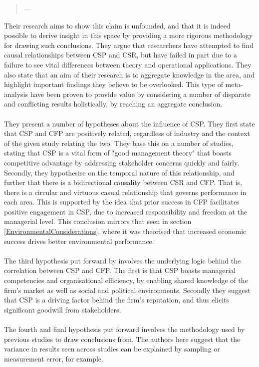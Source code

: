 {\begin{quote}
\hspace{2cm}--- \cite{orlitzky2003corporate}
\end{quote}
Their research aims to show this claim is unfounded, and that it is indeed possible to derive insight in this space by providing a more rigorous methodology for drawing such conclusions. They argue that researchers have attempted to find causal relationships between CSP and CSR, but have failed in part due to a failure to see vital differences between theory and operational applications. They also state that an aim of their research is to aggregate knowledge in the area, and highlight important findings they believe to be overlooked. This type of meta-analysis have been proven to provide value by considering a number of disparate and conflicting results holistically, by reaching an aggregate conclusion.\\\\
They present a number of hypotheses about the influence of CSP. They first state that CSP and CFP are positively related, regardless of industry and the context of the given study relating the two. They base this on a number of studies, stating that CSP is a vital form of "good management theory" that boasts competitive advantage by addressing stakeholder concerns quickly and fairly.  Secondly, they hypothesise on the temporal nature of this relationship, and further that there is a bidirectional causality between CSR and CFP. That is, there is a circular and virtuous casual relationship that governs performance in each area. This is supported by the idea that prior success in CFP facilitates positive engagement in CSP, due to increased responsibility and freedom at the managerial level. This conclusion mirrors that seen in section \ref{EnvironmentalConsiderations}, where it was theorised that increased economic success drives better environmental performance.\\\\
The third hypothesis put forward by \cite{orlitzky2003corporate} involves the underlying logic behind the correlation between CSP and CFP. The first is that CSP boasts managerial competencies and organisational efficiency, by enabling shared knowledge of the firm's market as well as social and political environments. Secondly they suggest that CSP is a driving factor behind the firm's reputation, and thus elicits significant goodwill from stakeholders. \\\\
The fourth and final hypothesis put forward involves the methodology used by previous studies to draw conclusions from. The authors here suggest that the variance in results seen across studies can be explained by sampling or measurement error, for example. \\\\
}
